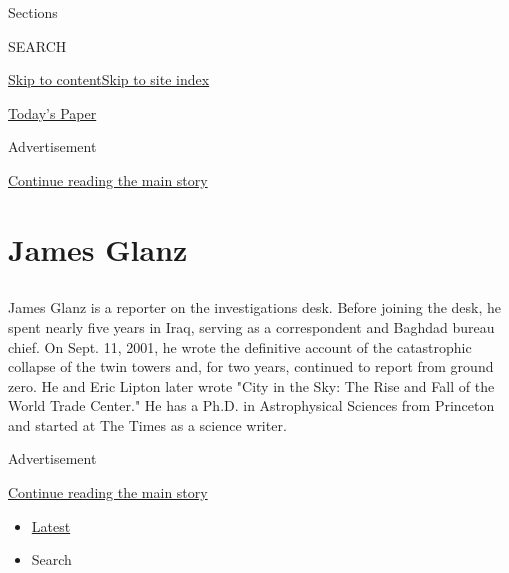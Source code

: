Sections

SEARCH

\protect\hyperlink{site-content}{Skip to
content}\protect\hyperlink{site-index}{Skip to site index}

\href{https://myaccount.nytimes3xbfgragh.onion/auth/login?response_type=cookie\&client_id=vi}{}

\href{https://www.nytimes3xbfgragh.onion/section/todayspaper}{Today's
Paper}

Advertisement

\protect\hyperlink{after-top}{Continue reading the main story}

\hypertarget{james-glanz}{%
\section{James Glanz}\label{james-glanz}}

\subsection{}

James Glanz is a reporter on the investigations desk. Before joining the
desk, he spent nearly five years in Iraq, serving as a correspondent and
Baghdad bureau chief. On Sept. 11, 2001, he wrote the definitive account
of the catastrophic collapse of the twin towers and, for two years,
continued to report from ground zero. He and Eric Lipton later wrote
"City in the Sky: The Rise and Fall of the World Trade Center." He has a
Ph.D. in Astrophysical Sciences from Princeton and started at The Times
as a science writer.

Advertisement

\protect\hyperlink{after-mid1}{Continue reading the main story}

\begin{itemize}
\tightlist
\item
  \protect\hyperlink{stream-panel}{Latest}
\item
  Search
\end{itemize}

